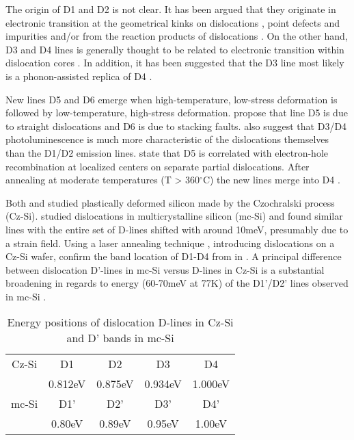 The origin of D1 and D2 is not clear. It has been argued that they originate in electronic transition at the geometrical kinks on dislocations \cite{suezawa83}, point defects \cite{sauer85} and impurities \cite{higgs91} and/or from the reaction products of dislocations \cite{sekiguchi95}. On the other hand, D3 and D4 lines is generally thought to be related to electronic transition within dislocation cores \cite{kveder95}. In addition, it has been suggested that the D3 line most likely is a phonon-assisted replica of D4 \cite{kveder95}.

New lines D5 and D6 emerge when high-temperature, low-stress deformation is followed by low-temperature, high-stress deformation. \cite{sauer85} propose that line D5 is due to straight dislocations and D6 is due to stacking faults. \cite{sauer85} also suggest that D3/D4 photoluminescence is much more characteristic of the dislocations themselves than the D1/D2 emission lines. \cite{weronek91} state that D5 is correlated with electron-hole recombination at localized centers on separate partial dislocations. After annealing at moderate temperatures (T > 360$^\circ$C) the new lines merge into D4 \cite{weronek91}.

Both \cite{drozdov76} and \cite{sauer85} studied plastically deformed silicon made by the Czochralski process (Cz-Si). \cite{tarasov00} studied  dislocations in multicrystalline silicon (mc-Si) and found similar lines with the entire set of D-lines shifted with around 10meV, presumably due to a strain field. Using a laser annealing technique \cite{staiger94}, introducing dislocations on a Cz-Si wafer, confirm the band location of D1-D4 from \cite{sauer85} in \cite{tarasov00}. A principal difference between dislocation D'-lines in mc-Si versus D-lines in Cz-Si is a substantial broadening in regards to energy (60-70meV at 77K) of the D1'/D2' lines observed in mc-Si \cite{tarasov00}.

\begin{table}[H]
\centering
\begin{tabular}{|c|c|c|c|c|}
\hline
Cz-Si \cite{drozdov76} & D1 & D2 & D3 & D4 \\
	& 0.812eV & 0.875eV & 0.934eV & 1.000eV \\
\hline
mc-Si \cite{tarasov00} & D1' & D2' & D3' & D4' \\
		& 0.80eV & 0.89eV & 0.95eV & 1.00eV \\
\hline
\end{tabular}
\caption{Energy positions of dislocation D-lines in Cz-Si and D' bands in mc-Si}
\label{tarasovlines}
\end{table}

